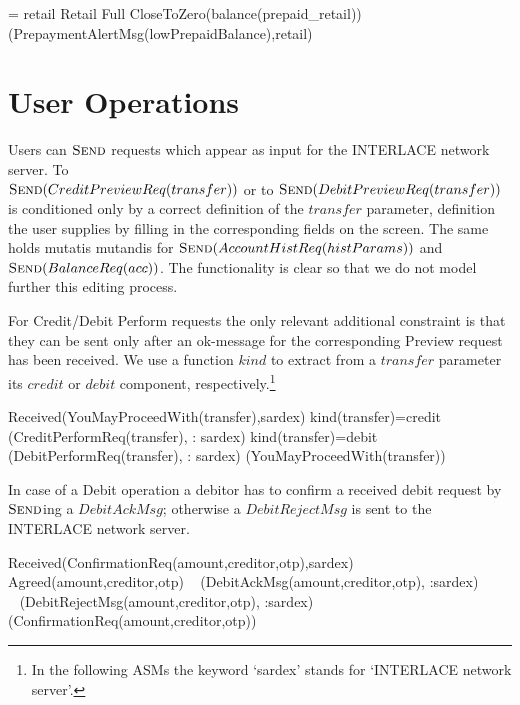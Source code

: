 \begin{asm}
=\+
  \FORALL  retail  \in Retail \cup Full \+
     \IF CloseToZero(balance(prepaid_{retail}))  \THEN \+
        (PrepaymentAlertMsg(lowPrepaidBalance),\TO retail)
\end{asm}
\section{User Operations}
\label{sect:usrops}
Users can $\hbox{\sc Send}$ requests which appear as input for the INTERLACE network server. To\\ $\hbox{\sc Send}(CreditPreviewReq(transfer))$ or to $\hbox{\sc Send}(DebitPreviewReq(transfer))$ is conditioned only by a correct definition of the $transfer$ parameter, definition the user supplies by filling in the corresponding  fields on the screen. The same holds mutatis mutandis for $\hbox{\sc Send}(AccountHistReq(histParams))$ and $\hbox{\sc Send}(BalanceReq(acc))$. The functionality is clear so that we do not model further this editing process.

For Credit/Debit Perform requests the only relevant additional constraint is that they can be sent only after an ok-message for the corresponding Preview request has been received. We use a function $kind$ to extract from a $transfer$ parameter its $credit$ or $debit$ component, respectively.\footnote{In the following ASMs the keyword `sardex' stands for `INTERLACE network server'.}

\begin{asm}
\IF Received(YouMayProceedWith(transfer),\FROM sardex) \THEN \+
\IF kind(transfer)=credit \THEN \+
(CreditPerformReq(transfer), \TO : sardex) \-
\IF kind(transfer)=debit \THEN \+
(DebitPerformReq(transfer), \TO : sardex)  \-
(YouMayProceedWith(transfer))
\end{asm}

In case of a Debit operation a debitor has to confirm a received debit request by $\hbox{\sc Send}$ing a $DebitAckMsg$; otherwise a $DebitRejectMsg$ is sent to the INTERLACE network server.
\begin{asm}
\IF Received(ConfirmationReq(amount,creditor,otp),\FROM sardex) \THEN \+
\IF Agreed(amount,creditor,otp)\+
\THEN ~ (DebitAckMsg(amount,creditor,otp), \TO :sardex) \\
\ELSE ~ (DebitRejectMsg(amount,creditor,otp), \TO :sardex)\-
(ConfirmationReq(amount,creditor,otp))
\end{asm}

